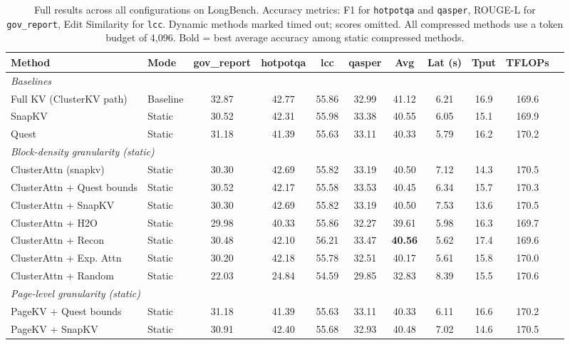 \begin{table}[t]
\centering
\small
\caption{Full results across all configurations on LongBench. Accuracy metrics: F1 for \texttt{hotpotqa} and \texttt{qasper}, ROUGE-L for \texttt{gov\_report}, Edit Similarity for \texttt{lcc}. Dynamic methods marked \dag{} timed out; scores omitted. All compressed methods use a token budget of 4{,}096. Bold = best average accuracy among static compressed methods.}
\label{tab:full_results}
\begin{tabular}{llccccccccc}
\toprule
Method & Mode & gov\_report & hotpotqa & lcc & qasper & Avg & Lat (s) & Tput & TFLOPs \\
\midrule
\midrule
\multicolumn{10}{l}{\textit{Baselines}} \\
Full KV (ClusterKV path) & Baseline & 32.87 & 42.77 & 55.86 & 32.99 & 41.12 & 6.21 & 16.9 & 169.6 \\
SnapKV & Static & 30.52 & 42.31 & 55.98 & 33.38 & 40.55 & 6.05 & 15.1 & 169.9 \\
Quest & Static & 31.18 & 41.39 & 55.63 & 33.11 & 40.33 & 5.79 & 16.2 & 170.2 \\
\midrule
\multicolumn{10}{l}{\textit{Block-density granularity (static)}} \\
ClusterAttn (snapkv) & Static & 30.30 & 42.69 & 55.82 & 33.19 & 40.50 & 7.12 & 14.3 & 170.5 \\
ClusterAttn + Quest bounds & Static & 30.52 & 42.17 & 55.58 & 33.53 & 40.45 & 6.34 & 15.7 & 170.3 \\
ClusterAttn + SnapKV & Static & 30.30 & 42.69 & 55.82 & 33.19 & 40.50 & 7.53 & 13.6 & 170.5 \\
ClusterAttn + H2O & Static & 29.98 & 40.33 & 55.86 & 32.27 & 39.61 & 5.98 & 16.3 & 169.7 \\
ClusterAttn + Recon & Static & 30.48 & 42.10 & 56.21 & 33.47 & \textbf{40.56} & 5.62 & 17.4 & 169.6 \\
ClusterAttn + Exp. Attn & Static & 30.20 & 42.18 & 55.78 & 32.51 & 40.17 & 5.61 & 15.8 & 170.0 \\
ClusterAttn + Random & Static & 22.03 & 24.84 & 54.59 & 29.85 & 32.83 & 8.39 & 15.5 & 170.6 \\
\midrule
\multicolumn{10}{l}{\textit{Page-level granularity (static)}} \\
PageKV + Quest bounds & Static & 31.18 & 41.39 & 55.63 & 33.11 & 40.33 & 6.11 & 16.6 & 170.2 \\
PageKV + SnapKV & Static & 30.91 & 42.40 & 55.68 & 32.93 & 40.48 & 7.02 & 14.6 & 170.5 \\

\end{tabular}
\end{table}
